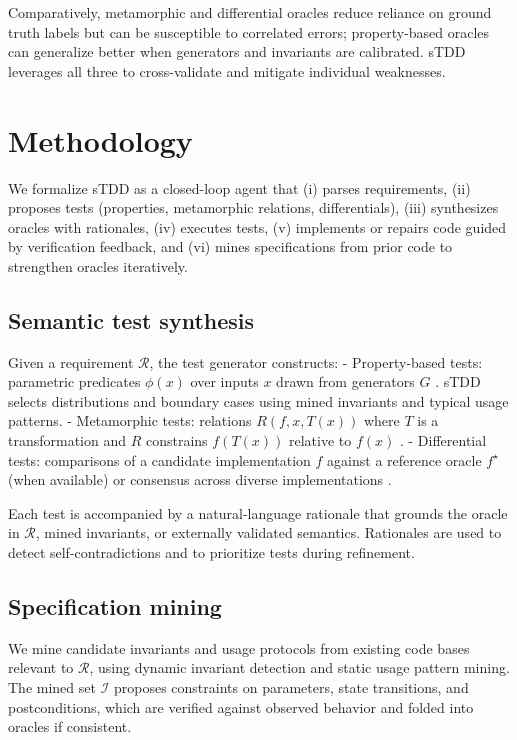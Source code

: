 \documentclass[10pt,twocolumn]{article}
\begin{document}
Comparatively, metamorphic and differential oracles reduce reliance on ground truth labels but can be susceptible to correlated errors; property-based oracles can generalize better when generators and invariants are calibrated. sTDD leverages all three to cross-validate and mitigate individual weaknesses.

\section{Methodology}
We formalize sTDD as a closed-loop agent that (i) parses requirements, (ii) proposes tests (properties, metamorphic relations, differentials), (iii) synthesizes oracles with rationales, (iv) executes tests, (v) implements or repairs code guided by verification feedback, and (vi) mines specifications from prior code to strengthen oracles iteratively.

\subsection{Semantic test synthesis}
Given a requirement $\mathcal{R}$, the test generator constructs:
- Property-based tests: parametric predicates $\phi(x)$ over inputs $x$ drawn from generators $G$ \cite{ClaessenHughes2000}. sTDD selects distributions and boundary cases using mined invariants and typical usage patterns.
- Metamorphic tests: relations $R(f, x, T(x))$ where $T$ is a transformation and $R$ constrains $f(T(x))$ relative to $f(x)$ \cite{Segura2016MetamorphicSurvey,Gao2020MetamorphicML}.
- Differential tests: comparisons of a candidate implementation $f$ against a reference oracle $f^\star$ (when available) or consensus across diverse implementations \cite{Yang2011Csmith,Shen2019DifferentialSurvey}.

Each test is accompanied by a natural-language rationale that grounds the oracle in $\mathcal{R}$, mined invariants, or externally validated semantics. Rationales are used to detect self-contradictions and to prioritize tests during refinement.

\subsection{Specification mining}
We mine candidate invariants and usage protocols from existing code bases relevant to $\mathcal{R}$, using dynamic invariant detection \cite{Ernst2007Daikon} and static usage pattern mining. The mined set $\mathcal{I}$ proposes constraints on parameters, state transitions, and postconditions, which are verified against observed behavior and folded into oracles if consistent.
\end{document}
